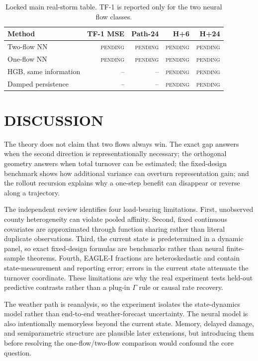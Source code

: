 \documentclass[twoside]{article}
\newcommand{\TBD}{\textsc{pending}}
\theoremstyle{plain}
\theoremstyle{definition}
\theoremstyle{remark}
\begin{document}
\begin{table}[t]
\centering
\caption{Locked main real-storm table. TF-1 is reported only for the two
neural flow classes.}
\label{tab:main}
\small
\begin{tabular}{lrrrr}
\toprule
Method & TF-1 MSE & Path-24 & H+6 & H+24\\
\midrule
Two-flow NN & \TBD & \TBD & \TBD & \TBD\\
One-flow NN & \TBD & \TBD & \TBD & \TBD\\
HGB, same information & -- & -- & \TBD & \TBD\\
Damped persistence & -- & -- & \TBD & \TBD\\
\bottomrule
\end{tabular}
\end{table}

\section{DISCUSSION}

The theory does not claim that two flows always win. The exact gap answers when
the second direction is representationally necessary; the orthogonal geometry
answers when total turnover can be estimated; the fixed-design benchmark shows
how additional variance can overturn representation gain; and the rollout
recursion explains why a one-step benefit can disappear or reverse along a
trajectory.

The independent review identifies four load-bearing limitations. First,
unobserved county heterogeneity can violate pooled affinity. Second, fixed
continuous covariates are approximated through function sharing rather than
literal duplicate observations. Third, the current state is predetermined in a
dynamic panel, so exact fixed-design formulas are benchmarks rather than neural
finite-sample theorems. Fourth, EAGLE-I fractions are heteroskedastic and contain
state-measurement and reporting error; errors in the current state attenuate the
turnover coordinate. These limitations are why the real experiment tests
held-out predictive contrasts rather than a plug-in \(\Gamma\) rule or causal
rate recovery.

The weather path is reanalysis, so the experiment isolates the state-dynamics
model rather than end-to-end weather-forecast uncertainty. The neural model is
also intentionally memoryless beyond the current state. Memory, delayed damage,
and semiparametric structure are plausible later extensions, but introducing
them before resolving the one-flow/two-flow comparison would confound the core
question.
\end{document}
